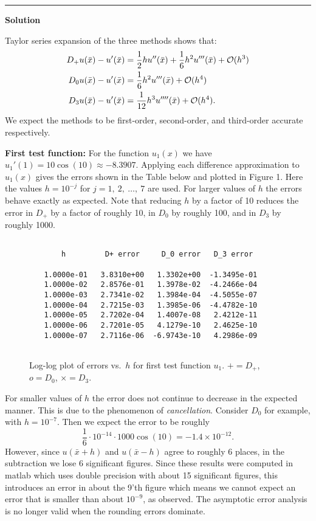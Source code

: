 \documentclass{article}
\newcommand{\sixth}{\frac{1}{6}}
\newcommand{\bx}{\bar x}
\begin{document}
\vskip 10pt
\hrule
\vskip 10pt


\centerline{\Large\bf Solution}
\vskip 10pt
Taylor series expansion of the three methods shows that:
\begin{equation*}
\begin{split}
D_+u(\bx) -u'(\bx) &=   \half hu''(\bx) + \sixth h^2
u'''(\bx) + \bigo(h^3)\\
D_0 u(\bx)-u'(\bx) &= \sixth h^2 u'''(\bx)+\bigo(h^4)\\
D_3u(\bx) - u'(\bx) &= \frac{1}{12} h^3 u''''(\bx) + \bigo(h^4).
\end{split}
\end{equation*}
We expect the methods to be first-order, second-order, and third-order
accurate respectively.

\newpage

{\bf First test function:}
For the function $u_1(x)$ we have $u_1'(1) = 10\cos(10) \approx -8.3907$.
Applying each difference approximation
to $u_1(x)$ gives the errors shown in the Table below and
plotted in Figure 1.
Here the values $h=10^{-j}$ for $j=1,~2,~\ldots,~7$ are used.
For larger values of $h$ the errors behave exactly as expected.
Note that reducing $h$ by a factor of 10 reduces the error
in $D_+$ by a factor of roughly 10, in $D_0$ by roughly 100, and in $D_3$ by
roughly 1000.

\begin{verbatim}

             h         D+ error     D_0 error   D_3 error

         1.0000e-01   3.8310e+00   1.3302e+00  -1.3495e-01
         1.0000e-02   2.8576e-01   1.3978e-02  -4.2466e-04
         1.0000e-03   2.7341e-02   1.3984e-04  -4.5055e-07
         1.0000e-04   2.7215e-03   1.3985e-06  -4.4782e-10
         1.0000e-05   2.7202e-04   1.4007e-08   2.4212e-11
         1.0000e-06   2.7201e-05   4.1279e-10   2.4625e-10
         1.0000e-07   2.7116e-06  -6.9743e-10   4.2986e-09


\end{verbatim}


\begin{figure}[h]
\hfil{}\hfil
\caption{Log-log plot of errors vs.\ $h$ for first test function $u_1$.
$+=D_+$, $o=D_0$, $\times = D_3$.}
\end{figure}


For smaller values of $h$ the error does not continue to  decrease
in the expected manner.  This is due to the phenomenon of {\it
cancellation}.  Consider $D_0$ for example, with $h=10^{-7}$.  Then we
expect the error to be roughly 
\[
\frac{1}{6} \cdot 10^{-14} \cdot 1000\cos(10) = -1.4 \times 10^{-12}.
\]
However, since $u(\bx+h)$ and $u(\bx-h)$ agree to roughly 6 places, in the
subtraction we lose 6 significant figures.  Since these results were
computed in matlab which uses double precision with about 15 significant
figures, this introduces an error in about the 9'th figure which means we
cannot expect an error that is smaller than about $10^{-9}$, as observed.
The asymptotic error analysis is no longer valid when the rounding errors
dominate.
\end{document}
